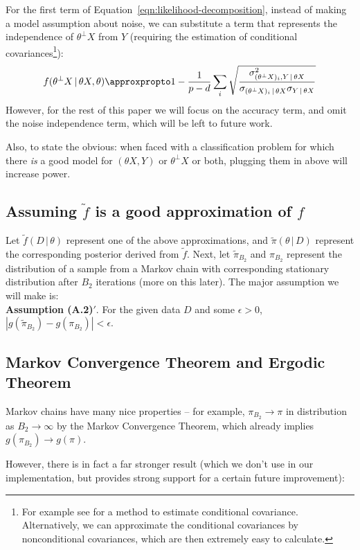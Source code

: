 \documentclass[ejs,preprint]{imsart}
\begin{document}
For the first term of Equation~\ref{eqn:likelihood-decomposition}, instead of making a model assumption about noise, we can substitute a term that represents the independence of $\theta^\perp X$ from $Y$ (requiring the estimation of conditional covariances\footnote{For example see \cite{FY98} for a method to estimate conditional covariance. Alternatively, we can approximate the conditional covariances by nonconditional covariances, which are then extremely easy to calculate.}):
\[
f(\theta^\perp X\,|\,\theta X, \theta) \approxpropto 1 - \frac{1}{p-d} \sum_i \sqrt\frac{\sigma^2_{(\theta^\perp X)_i,Y\,|\,\theta X}}{\sigma_{(\theta^\perp X)_i\,|\,\theta X}\sigma_{Y\,|\,\theta X}}
\]
However, for the rest of this paper we will focus on the accuracy term, and omit the noise independence term, which will be left to future work.

Also, to state the obvious: when faced with a classification problem for which there \emph{is} a good model for $(\theta X,Y)$ or $\theta^\perp X$ or both, plugging them in above will increase power.

\subsection{Assuming $\tilde f$ is a good approximation of $f$}

Let $\tilde f(D\,|\,\theta)$ represent one of the above approximations, and $\tilde\pi(\theta\,|\,D)$ represent the corresponding posterior derived from $\tilde f$. Next, let $\tilde \pi_{B_2}$ and $\pi_{B_2}$ represent the distribution of a sample from a Markov chain with corresponding stationary distribution after $B_2$ iterations (more on this later). The major assumption we will make is:\\

\noindent\textbf{Assumption (A.2)$'$}. For the given data $D$ and some $\epsilon>0$, $|g(\tilde\pi_{B_2})-g(\pi_{B_2})|<\epsilon$.

\subsection{Markov Convergence Theorem and Ergodic Theorem}

Markov chains have many nice properties -- for example, $\pi_{B_2}\to \pi$ in distribution as $B_2 \to \infty$ by the Markov Convergence Theorem, which already implies $g(\pi_{B_2})\to g(\pi)$.

However, there is in fact a far stronger result (which we don't use in our implementation, but provides strong support for a certain future improvement):
\end{document}
